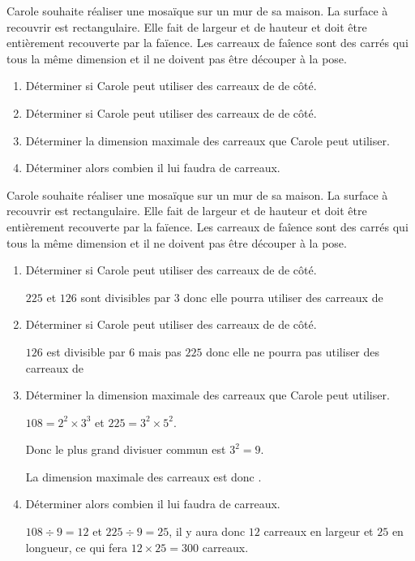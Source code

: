 \begin{exercice*}[Mosaïque]
    Carole souhaite réaliser une mosaïque sur un mur de sa maison. La surface à recouvrir est rectangulaire.
    Elle fait  de largeur et  de hauteur et doit être entièrement recouverte par la faïence.
    Les carreaux de faîence sont des carrés qui tous la même dimension et il ne doivent pas être découper à la pose.    
    \begin{enumerate}
        \item Déterminer si Carole peut utiliser des carreaux de  de côté.
        \item Déterminer si Carole peut utiliser des carreaux de  de côté.
        \item Déterminer la dimension maximale des carreaux que Carole peut utiliser.
        \item Déterminer alors combien il lui faudra de carreaux.
    \end{enumerate}
\end{exercice*}
\begin{corrige}
    Carole souhaite réaliser une mosaïque sur un mur de sa maison. La surface à recouvrir est rectangulaire.
    Elle fait  de largeur et  de hauteur et doit être entièrement recouverte par la faïence.
    Les carreaux de faîence sont des carrés qui tous la même dimension et il ne doivent pas être découper à la pose.

    \begin{enumerate}
        \item Déterminer si Carole peut utiliser des carreaux de  de côté.
        
        {\color{red} $225$ et $126$ sont divisibles par $3$ donc elle pourra utiliser des carreaux de }
        \item Déterminer si Carole peut utiliser des carreaux de  de côté.
        
        {\color{red} $126$ est divisible par $6$ mais pas $225$ donc elle ne pourra pas utiliser des carreaux de }
        \item Déterminer la dimension maximale des carreaux que Carole peut utiliser.
        
        {\color{red} $108 = 2^2\times 3^3$ et $225=3^2\times 5^2$.

        Donc le plus grand divisuer commun est $3^2=9$. 

        La dimension maximale des carreaux est donc .
        }
        \item Déterminer alors combien il lui faudra de carreaux.
        
        {\color{red} $108\div 9 = 12$ et $225\div 9 = 25$, il y aura donc $12$ carreaux en largeur et $25$ en longueur, ce qui fera $12\times 25 = 300$ carreaux.}
    \end{enumerate}
\end{corrige}

